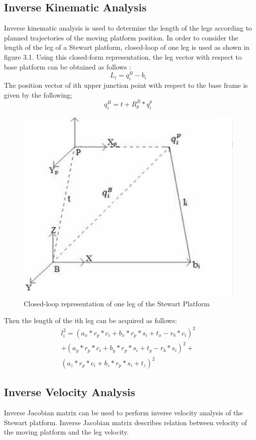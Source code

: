 \subsection{Inverse Kinematic Analysis}
Inverse kinematic analysis is used to determine the length of the legs according to planned trajectories of the moving platform position. In order to consider the length of the leg of a Stewart platform, closed-loop of one leg is used as shown in figure 3.1. Using this closed-form representation, the leg
vector with respect to base platform can be obtained as follows \cite{csumnu2017simulation}:
\begin{equation}
\label{eqn}
L_{i} = q_{i}^{B} - b_{i}
\end{equation}
The position vector of ith upper junction point with respect to the base frame is given by the following;
\begin{equation}
\label{eqn}
q_{i}^{B} = t + R_{p}^{B} * q_{i}^{p}
\end{equation}
\begin{center}
	\begin{figure}[!h]
	\centering
	\includegraphics[width=0.6\linewidth]{Figures/Fig12}
	\caption[Closed-loop representation]{Closed-loop representation of one leg of the Stewart Platform \cite{csumnu2017simulation}}
	\end{figure}
\end{center}
Then the length of the ith leg can be acquired as follows:
\newpage
\begin{multline}
\label{eqn}
l_{i}^2 = (a_{x} * r_{p} * c_{i} + b_{x}*r_{p}*s_{i}
+ t_{x}-r_{b}*c_{i})^2 \\+ (a_{y}*r_{p}*c_{i} + b_{y}*r_{p}*s_{i} + t_{y}-r_{b}*s_{i})^2+ \\(a_{z}*r_{p}*c_{i}+b_{z}*r_{p}*s_{i}+t_{z})^2
\end{multline}
\subsection{Inverse Velocity Analysis}
Inverse Jacobian matrix can be used to perform inverse velocity analysis of the Stewart
platform. Inverse Jacobian matrix describes relation between velocity of the moving platform and the leg velocity.

